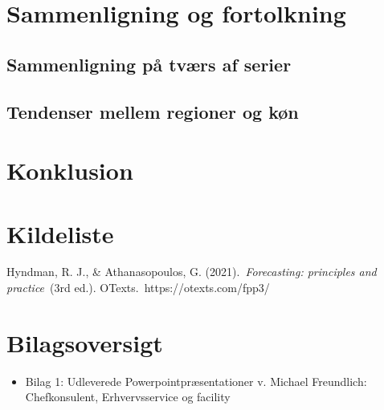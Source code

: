 \documentclass[
]{article}
\providecommand{\tightlist}{%
  \setlength{\itemsep}{0pt}\setlength{\parskip}{0pt}}\usepackage{longtable,booktabs,array}
\begin{document}
\section{Sammenligning og
fortolkning}\label{sammenligning-og-fortolkning}

\subsection{Sammenligning på tværs af
serier}\label{sammenligning-puxe5-tvuxe6rs-af-serier}

\subsection{Tendenser mellem regioner og
køn}\label{tendenser-mellem-regioner-og-kuxf8n}

\section{Konklusion}\label{konklusion}

\newpage

\section{Kildeliste}\label{kildeliste}

Hyndman, R. J., \& Athanasopoulos, G. (2021).~\emph{Forecasting:
principles and practice}~(3rd ed.). OTexts.~https://otexts.com/fpp3/

\newpage

\section{Bilagsoversigt}\label{bilagsoversigt}

\begin{itemize}
\tightlist
\item
  Bilag 1: Udleverede Powerpointpræsentationer v. Michael Freundlich:
  Chefkonsulent, Erhvervsservice og facility
\end{itemize}
\end{document}
